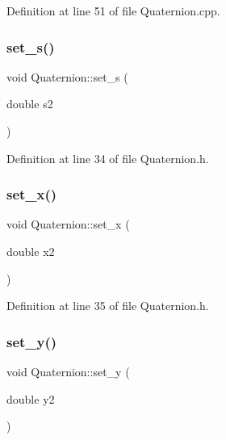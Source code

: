 Definition at line 51 of file Quaternion.\+cpp.

\mbox{\label{class_quaternion_a21bf0e35dfb1616fe519699d7182a22c}} 
\subsubsection{\texorpdfstring{set\+\_\+s()}{set\_s()}}
{\footnotesize\ttfamily void Quaternion\+::set\+\_\+s (\begin{DoxyParamCaption}\item[{double}]{s2 }\end{DoxyParamCaption})\hspace{0.3cm}{\ttfamily [inline]}}



Definition at line 34 of file Quaternion.\+h.

\mbox{\label{class_quaternion_ac3e8b4157202187c4b219a828490af52}} 
\subsubsection{\texorpdfstring{set\+\_\+x()}{set\_x()}}
{\footnotesize\ttfamily void Quaternion\+::set\+\_\+x (\begin{DoxyParamCaption}\item[{double}]{x2 }\end{DoxyParamCaption})\hspace{0.3cm}{\ttfamily [inline]}}



Definition at line 35 of file Quaternion.\+h.

\mbox{\label{class_quaternion_ad1e20cfd1c7ac6eeff342d85e071e35f}} 
\subsubsection{\texorpdfstring{set\+\_\+y()}{set\_y()}}
{\footnotesize\ttfamily void Quaternion\+::set\+\_\+y (\begin{DoxyParamCaption}\item[{double}]{y2 }\end{DoxyParamCaption})\hspace{0.3cm}{\ttfamily [inline]}}



